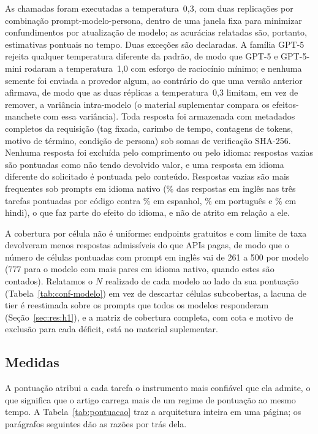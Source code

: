 As chamadas foram executadas a temperatura~0,3, com duas replicações por
combinação prompt-modelo-persona, dentro de uma janela fixa para minimizar
confundimentos por atualização de modelo; as acurácias relatadas são, portanto,
estimativas pontuais no tempo. Duas exceções são declaradas. A família GPT-5
rejeita qualquer temperatura diferente da padrão, de modo que GPT-5 e
GPT-5-mini rodaram a temperatura~1,0 com esforço de raciocínio mínimo; e
nenhuma semente foi enviada a provedor algum, ao contrário do que uma versão
anterior afirmava, de modo que as duas réplicas a temperatura~0,3 limitam, em
vez de remover, a variância intra-modelo (o material suplementar compara os
efeitos-manchete com essa variância). Toda resposta foi armazenada com
metadados completos da requisição (tag fixada, carimbo de tempo, contagens de
tokens, motivo de término, condição de persona) sob somas de verificação
SHA-256. Nenhuma resposta foi excluída pelo comprimento ou pelo idioma:
respostas vazias são pontuadas como não tendo devolvido valor, e uma resposta em
idioma diferente do solicitado é pontuada pelo conteúdo. Respostas vazias são
mais frequentes sob prompts em idioma nativo (\nemptyen\% das respostas em
inglês nas três tarefas pontuadas por código contra \nemptyes\% em espanhol,
\nemptypt\% em português e \nemptyhi\% em hindi), o que faz parte do efeito do
idioma, e não de atrito em relação a ele.

A cobertura por célula não é uniforme: endpoints gratuitos e com limite de taxa
devolveram menos respostas admissíveis do que APIs pagas, de modo que o número
de células pontuadas com prompt em inglês vai de 261 a 500 por modelo (777 para
o modelo com mais pares em idioma nativo, quando estes são contados). Relatamos
o $N$ realizado de cada modelo ao lado da sua pontuação
(Tabela~\ref{tab:conf-modelo}) em vez de descartar células subcobertas, a lacuna
de tier é reestimada sobre os prompts que todos os modelos responderam
(Seção~\ref{sec:res:h1}), e a matriz de cobertura completa, com cota e motivo de
exclusão para cada déficit, está no material suplementar.

\subsection{Medidas}

A pontuação atribui a cada tarefa o instrumento mais confiável que ela admite,
o que significa que o artigo carrega mais de um regime de pontuação ao mesmo
tempo. A Tabela~\ref{tab:pontuacao} traz a arquitetura inteira em uma página; os
parágrafos seguintes dão as razões por trás dela.

